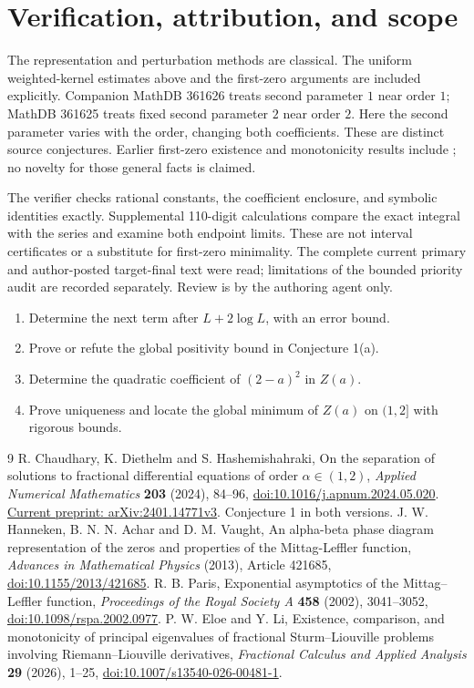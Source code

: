 \documentclass[11pt]{article}
\begin{document}
\section*{Verification, attribution, and scope}
The representation and perturbation methods are classical. The
uniform weighted-kernel estimates above and the first-zero arguments
are included explicitly. Companion MathDB 361626 treats second
parameter $1$ near order $1$; MathDB 361625 treats fixed second
parameter $2$ near order $2$. Here the second parameter varies with
the order, changing both coefficients. These are distinct source
conjectures. Earlier first-zero existence and monotonicity results
include \cite{EL}; no novelty for those general facts is claimed.

The verifier checks rational constants, the coefficient enclosure,
and symbolic identities exactly. Supplemental 110-digit calculations
compare the exact integral with the series and examine both endpoint
limits. These are not interval certificates or a substitute for
first-zero minimality. The complete current primary and author-posted
target-final text were read; limitations of the bounded priority
audit are recorded separately. Review is by the authoring agent only.

\begin{enumerate}[label=\textbf{Task \arabic*:},start=2,leftmargin=*]
\item Determine the next term after $L+2\log L$, with an error bound.
\item Prove or refute the global positivity bound in Conjecture 1(a).
\item Determine the quadratic coefficient of $(2-a)^2$ in $Z(a)$.
\item Prove uniqueness and locate the global minimum of $Z(a)$
on $(1,2]$ with rigorous bounds.
\end{enumerate}
\small
\begin{thebibliography}{9}
 R. Chaudhary, K. Diethelm and S. Hashemishahraki,
On the separation of solutions to fractional differential equations
of order $\alpha\in(1,2)$, \emph{Applied Numerical Mathematics}
\textbf{203} (2024), 84--96,
\href{https://doi.org/10.1016/j.apnum.2024.05.020}{doi:10.1016/j.apnum.2024.05.020}.
\href{https://arxiv.org/abs/2401.14771}{Current preprint: arXiv:2401.14771v3}.
Conjecture 1 in both versions.
 J. W. Hanneken, B. N. N. Achar and D. M. Vaught,
An alpha-beta phase diagram representation of the zeros and properties
of the Mittag-Leffler function, \emph{Advances in Mathematical Physics}
(2013), Article 421685,
\href{https://doi.org/10.1155/2013/421685}{doi:10.1155/2013/421685}.
 R. B. Paris, Exponential asymptotics of the
Mittag--Leffler function, \emph{Proceedings of the Royal Society A}
\textbf{458} (2002), 3041--3052,
\href{https://doi.org/10.1098/rspa.2002.0977}{doi:10.1098/rspa.2002.0977}.
 P. W. Eloe and Y. Li, Existence, comparison, and
monotonicity of principal eigenvalues of fractional Sturm--Liouville
problems involving Riemann--Liouville derivatives,
\emph{Fractional Calculus and Applied Analysis} \textbf{29} (2026),
1--25, \href{https://doi.org/10.1007/s13540-026-00481-1}{doi:10.1007/s13540-026-00481-1}.
\end{thebibliography}
\end{document}
